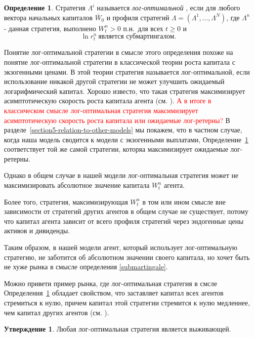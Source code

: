 \documentclass[a4paper,12pt,russian]{article} %
\theoremstyle{definition}
\newtheorem{definition}{Определение}
\newtheorem{proposition}{Утверждение}
\begin{document}
\begin{definition}
\label{def-log-optimal} 
Стратегия $\Lambda^i$ называется \emph{лог-оптимальной }, если  для любого вектора начальных капиталов $\bar W_0$ и профиля стратегий $\Lambda=(\Lambda^1,\ldots,\Lambda^N)$, где $\Lambda^n$ - данная стратегия, выполнено $W_t^n > 0$ п.н.\ для всех $t\ge 0$ и
\begin{equation}
\label{submartingale}
\ln r_t^n\ \text{является субмартингалом}.
\end{equation}
\end{definition}

Понятие лог-оптимальной стратегии в смысле этого определения похоже на понятие лог-оптимальной стратегии в классической теории роста капитала с экзогенными ценами. В этой теории  стратегия называется лог-оптимальной, если использование никакой другой стратегии не может улучшить ожидаемый логарифмический капитал. Хорошо известо, что такая стратегия максимизирует асимптотическую скорость роста капитала агента (см. \cite{AlgoetCover1988}). \textcolor{red} { А в итоге в классическом смысле лог-оптимальная стратегия максимизирует асимптотическую скорость роста капитала или ожидаемые лог-ретерны?}
В разделе~\ref{section5-relation-to-other-models} мы покажем, что в частном случае, когда наша модель сводится к модели с экзогенными выплатами, Определение~\ref{def-log-optimal} соответствует той же самой стратегии, которяа максимизирует ожидаемые лог-ретерны.

Однако в общем случае в нашей модели лог-оптимальная стратегия может не максимизировать абсолютное значение капитала $W_t^n$ агента.

Более того, стратегия, максимизирующая $W_t^n$ в том или ином смысле вне зависимости от стратегий других агентов в общем случае не существует, потому что капитал агента зависит от всего профиля стратегий через эндогенные цены активов и дивиденды.

Таким образом, в нашей модели агент, который использует лог-оптимальную стратегию, не заботится об абсолютном значении своего капитала, но хочет быть не хуже рынка в смысле определения \eqref{submartingale}.

Можно привети пример рынка, где лог-оптимальная стратегия в смсле Определения~\ref{def-log-optimal} обладает свойством, что заставляет капитал всех агентов стремиться к нулю, причем капитал этой стратегии стремится к нулю медленнее, чем капитал других агентов (см. \cite{Drokin-Zhitlukhin2020}).

\begin{proposition}
Любая лог-оптимальная стратегия является выживающей.
\end{proposition}
\end{document}
